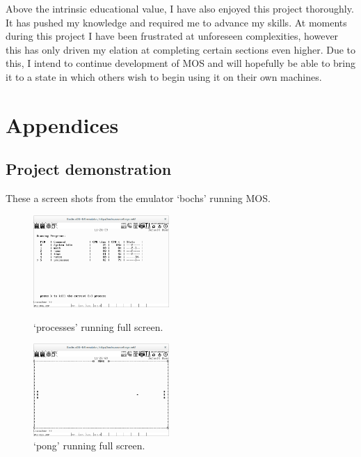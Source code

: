 \documentclass[a4paper]{report}
\begin{document}
Above the intrinsic educational value, I have also enjoyed this project thoroughly. It has pushed my knowledge and required me to advance my skills. At moments during this project I have been frustrated at unforeseen complexities, however this has only driven my elation at completing certain sections even higher. Due to this, I intend to continue development of MOS and will hopefully be able to bring it to a state in which others wish to begin using it on their own machines.





\chapter{Appendices}

\section{Project demonstration}

\label{sec:projdem}

These a screen shots from the emulator `bochs' running MOS.

\begin{figure}[ht]
\centering
\begin{minipage}{.5\textwidth}
  \centering
  \includegraphics[width=195px]{demoimages/processes}
  \caption{`processes' running full screen.}
  \label{fig:demo-processes}
\end{minipage}%
\begin{minipage}{.5\textwidth}
  \centering
  \includegraphics[width=195px]{demoimages/full-screen-pong}
  \caption{`pong' running full screen.}
  \label{fig:demo-pong}
\end{minipage}
\end{figure}
\end{document}
